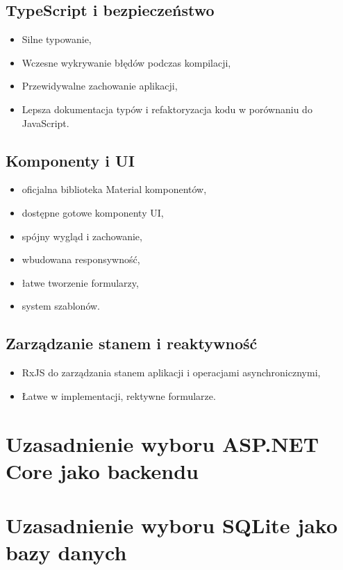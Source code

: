 \subsection{TypeScript i bezpieczeństwo}
\begin{itemize}
	\item Silne typowanie,
	\item Wczesne wykrywanie błędów podczas kompilacji,
	\item Przewidywalne zachowanie aplikacji,
	\item Lepsza dokumentacja typów i refaktoryzacja kodu w porównaniu do JavaScript.
\end{itemize}

\subsection{Komponenty i UI}
\begin{itemize}
	\item oficjalna biblioteka Material komponentów,
	\item dostępne gotowe komponenty UI,
	\item spójny wygląd i zachowanie,
	\item wbudowana responsywność,
	\item łatwe tworzenie formularzy,
	\item system szablonów.
\end{itemize}

\subsection{Zarządzanie stanem i reaktywność}
\begin{itemize}
	\item RxJS do zarządzania stanem aplikacji i operacjami asynchronicznymi,
	\item Łatwe w implementacji, rektywne formularze.
\end{itemize}

\section{Uzasadnienie wyboru ASP.NET Core jako backendu}

\section{Uzasadnienie wyboru SQLite jako bazy danych}


